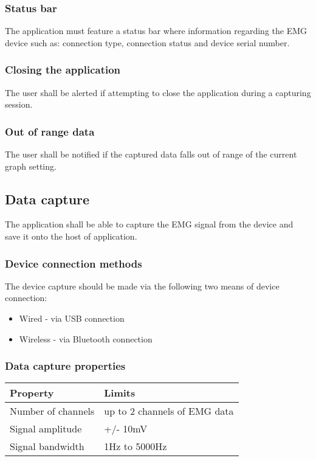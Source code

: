 \documentclass[12pt,a4paper]{article}
\begin{document}
\subsubsection{Status bar}

The application must feature a status bar where information regarding the EMG device such as: connection type, connection status and device serial number.

\subsubsection{Closing the application}

The user shall be alerted if attempting to close the application during a capturing session.

\subsubsection{Out of range data}

The user shall be notified if the captured data falls out of range of the current graph setting.

\subsection{Data capture}

The application shall be able to capture the EMG signal from the device and save it onto the host of application.

\subsubsection{Device connection methods}

The device capture should be made via the following two means of device connection:

\begin{itemize}
	\item Wired - via USB connection
	\item Wireless - via Bluetooth connection
\end{itemize}

\subsubsection{Data capture properties}

\begin{table}[htbp]
	\centering
	
	\begin{tabular}{|l|l|}
		\hline
		\textbf{Property}  & \textbf{Limits} \\
		\hline
		Number of channels & up to 2 channels of EMG data\\
		\hline
		Signal amplitude & +/- 10mV \\
		\hline
		Signal bandwidth & 1Hz to 5000Hz \\
		\hline
	\end{tabular}
\end{table}
\end{document}
